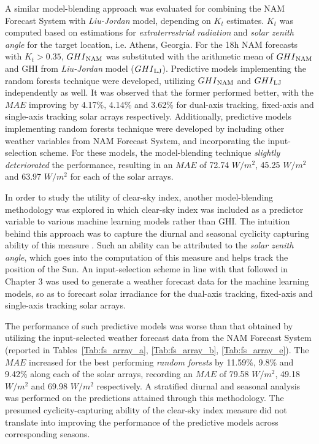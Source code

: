 \par A similar model-blending approach was evaluated for combining the NAM Forecast System with \textit{Liu-Jordan} model, depending on $K_t$ estimates. $K_t$ was computed based on estimations for \textit{extraterrestrial radiation} and \textit{solar zenith angle} for the target location, i.e. Athens, Georgia. For the 18h NAM forecasts with $K_t > 0.35$, $GHI\textsubscript{NAM}$ was substituted with the arithmetic mean of $GHI\textsubscript{NAM}$ and GHI from \textit{Liu-Jordan} model ($GHI\textsubscript{LJ}$). Predictive models implementing the random forests technique were developed, utilizing $GHI\textsubscript{NAM}$ and $GHI\textsubscript{LJ}$ independently as well. It was observed that the former performed better, with the $MAE$ improving by 4.17\%, 4.14\% and 3.62\% for dual-axis tracking, fixed-axis and single-axis tracking solar arrays respectively. Additionally, predictive models implementing random forests technique were developed by including other weather variables from NAM Forecast System, and incorporating the input-selection scheme. For these models, the model-blending technique \textit{slightly deteriorated} the performance, resulting in an $MAE$ of 72.74 $W/m^2$, 45.25 $W/m^2$ and 63.97 $W/m^2$ for each of the solar arrays.

\par In order to study the utility of clear-sky index, another model-blending methodology was explored in which clear-sky index was included as a predictor variable to various machine learning models rather than GHI. The intuition behind this approach was to capture the diurnal and seasonal cyclicity capturing ability of this measure \cite{multimodel_clearskyindex2}. Such an ability can be attributed to the \textit{solar zenith angle}, which goes into the computation of this measure and helps track the position of the Sun. An input-selection scheme in line with that followed in Chapter 3 was used to generate a weather forecast data for the machine learning models, so as to forecast solar irradiance for the dual-axis tracking, fixed-axis and single-axis tracking solar arrays.

\par The performance of such predictive models was worse than that obtained by utilizing the input-selected weather forecast data from the NAM Forecast System (reported in Tables~\ref{Tab:fs_array_a}, \ref{Tab:fs_array_b}, \ref{Tab:fs_array_e}). The $MAE$ increased for the best performing \textit{random forests} by 11.59\%, 9.8\% and 9.42\% along each of the solar arrays, recording an $MAE$ of 79.58 $W/m^2$, 49.18 $W/m^2$ and 69.98 $W/m^2$ respectively. A stratified diurnal and seasonal analysis was performed on the predictions attained through this methodology. The presumed cyclicity-capturing ability of the clear-sky index measure did not translate into improving the performance of the predictive models across corresponding seasons.

